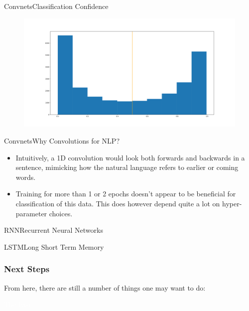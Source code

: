 \documentclass{beamer}
\begin{document}
\begin{frame}{Convnets}{Classification Confidence}

  \begin{figure}[ht]
    \centering
    \includegraphics[width=1.0\textwidth]{convnet_histogram}
  \end{figure}

\end{frame}

\begin{frame}{Convnets}{Why Convolutions for NLP?}

  \begin{itemize}

  \item Intuitively, a 1D convolution would look both forwards and backwards in
    a sentence, mimicking how the natural language refers to earlier or coming
    words.

  \item Training for more than 1 or 2 epochs doesn't appear to be beneficial for
    classification of this data. This does however depend quite a lot on
    hyper-parameter choices.

  \end{itemize}

\end{frame}



\begin{frame}{RNN}{Recurrent Neural Networks}

\end{frame}

\begin{frame}{LSTM}{Long Short Term Memory}

\end{frame}


\begin{frame}
  \frametitle{Next Steps}
  From here, there are still a number of things one may want to do:
\end{frame}

\bgroup
{}
\begin{frame}[t,plain]{}{}
  \begin{center}
    {\tiny \textcolor{white}{The End}}
  \end{center}
\end{frame}
\egroup
\end{document}
